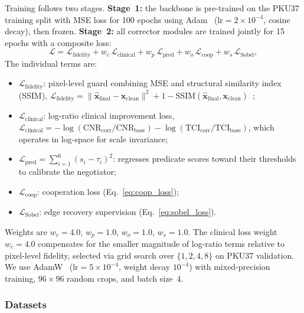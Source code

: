 \documentclass[journal,twoside,web]{ieeecolor}
\begin{document}
Training follows two stages. \textbf{Stage~1:} the backbone is pre-trained on the PKU37 training split with MSE loss for 100 epochs using Adam~\cite{kingma2015adam} ($\text{lr} = 2\!\times\!10^{-4}$, cosine decay), then frozen. \textbf{Stage~2:} all corrector modules are trained jointly for 15 epochs with a composite loss:
\begin{equation}
\mathcal{L} = \mathcal{L}_\text{fidelity} + w_c\,\mathcal{L}_\text{clinical} + w_p\,\mathcal{L}_\text{pred} + w_o\,\mathcal{L}_\text{coop} + w_s\,\mathcal{L}_\text{Sobel},
\label{eq:total_loss}
\end{equation}
The individual terms are:
\begin{itemize}[nosep, leftmargin=*]
\item $\mathcal{L}_\text{fidelity}$: pixel-level guard combining MSE and structural similarity index (SSIM), $\mathcal{L}_\text{fidelity} = \|\hat{\mathbf{x}}_\text{final} - \mathbf{x}_\text{clean}\|^2 + 1 - \text{SSIM}(\hat{\mathbf{x}}_\text{final}, \mathbf{x}_\text{clean})$~\cite{wang2004image};
\item $\mathcal{L}_\text{clinical}$: log-ratio clinical improvement loss, $\mathcal{L}_\text{clinical} = -\log(\text{CNR}_\text{corr}/\text{CNR}_\text{base}) - \log(\text{TCI}_\text{corr}/\text{TCI}_\text{base})$, which operates in log-space for scale invariance;
\item $\mathcal{L}_\text{pred} = \sum_{i=1}^{6}(s_i - \tau_i)^2$: regresses predicate scores toward their thresholds to calibrate the negotiator;
\item $\mathcal{L}_\text{coop}$: cooperation loss (Eq.~\eqref{eq:coop_loss});
\item $\mathcal{L}_\text{Sobel}$: edge recovery supervision (Eq.~\eqref{eq:sobel_loss}).
\end{itemize}
Weights are $w_c = 4.0$, $w_p = 1.0$, $w_o = 1.0$, $w_s = 1.0$. The clinical loss weight $w_c = 4.0$ compensates for the smaller magnitude of log-ratio terms relative to pixel-level fidelity, selected via grid search over $\{1, 2, 4, 8\}$ on PKU37 validation. We use AdamW~\cite{loshchilov2019decoupled} ($\text{lr} = 5\!\times\!10^{-4}$, weight decay $10^{-4}$) with mixed-precision training, $96\times 96$ random crops, and batch size~4.

\subsubsection{Datasets}
\label{sec:datasets}
\end{document}
